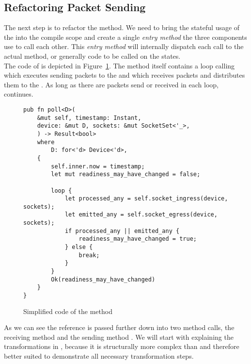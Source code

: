 \subsection{Refactoring Packet Sending}
The next step is to refactor the  method. We need to bring the stateful usage of the \dev{} into the compile scope and create a single \emph{entry method} the three 
components use to call each other. This \emph{entry method} will internally dispatch each call to the actual method, or generally code to be called on the states.\\

The code of  is depicted in Figure~\ref{fig:pollCode}. The method itself contains a loop calling  which executes sending packets to the  and  which receives packets and distributes them to the . As long as there are packets send or received in each loop,  continues. \\

\begin{figure}[H]
    \centering
    
\begin{verbatim}
pub fn poll<D>(
    &mut self, timestamp: Instant,
    device: &mut D, sockets: &mut SocketSet<'_>,
    ) -> Result<bool>
    where
        D: for<'d> Device<'d>,
    {
        self.inner.now = timestamp;
        let mut readiness_may_have_changed = false;

        loop {
            let processed_any = self.socket_ingress(device, sockets);
            let emitted_any = self.socket_egress(device, sockets);
            if processed_any || emitted_any {
                readiness_may_have_changed = true;
            } else {
                break;
            }
        }
        Ok(readiness_may_have_changed)
    }
}
\end{verbatim}
    \caption{Simplified code of the  method}
    \label{fig:pollCode}
\end{figure}

As we can see the \dev{} reference is passed further down into two method calls, the receiving method  and the sending method . We will start with explaining the transformations in , because it is structurally  more complex than  and therefore better suited to demonstrate all necessary transformation steps.

